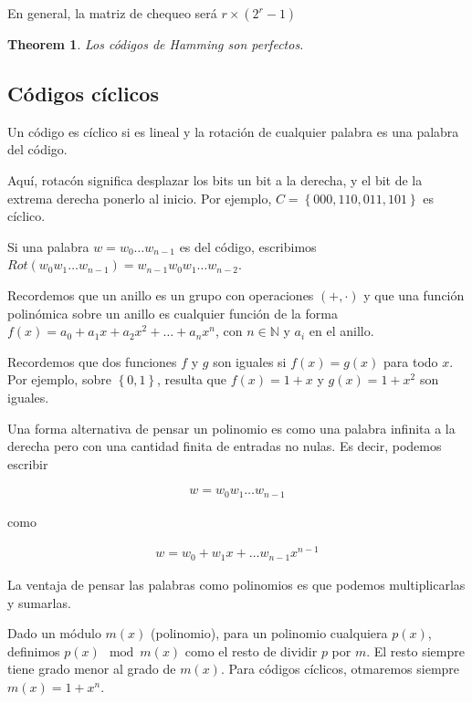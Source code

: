 \documentclass[a4paper]{article}
\newtheorem{theorem}{Theorem}
\newtheorem{theorem}{Theorem}
\begin{document}
En general, la matriz de chequeo será $r \times (2^r - 1)$

\begin{theorem}
    Los códigos de Hamming son perfectos.
\end{theorem}

\subsection{Códigos cíclicos}

\begin{definition}
    Un código es cíclico si es lineal y la rotación de cualquier palabra es una palabra 
    del código.
\end{definition}

Aquí, rotacón significa desplazar los bits un bit a la derecha, y el bit de la extrema 
derecha ponerlo al inicio. Por ejemplo, $C = \left\{ 000, 110, 011, 101 \right\} $ es 
cíclico.

Si una palabra $w = w_0 \ldots w_{n-1}$ es del código, escribimos $Rot(w_0 w_1
\ldots w_{n-1}) = w_{n-1}w_0 w_1 \ldots w_{n-2}$.

Recordemos que un anillo es un grupo con operaciones $(+, \cdot)$ y que una
función polinómica sobre un anillo es cualquier función de la forma $f(x) = a_0
+ a_1x + a_2x^2 + \ldots + a_nx^n$, con $n \in \mathbb{N}$ y $a_i$ en el
anillo.

Recordemos que dos funciones $f$ y $g$ son iguales si $f(x) = g(x)$ para todo $x$.
Por ejemplo, sobre $\left\{ 0, 1 \right\} $, resulta que $f(x) = 1 + x$ y $g(x) = 1 + x^2$
son iguales.

Una forma alternativa de pensar un polinomio es como una palabra infinita a la derecha 
pero con una cantidad finita de entradas no nulas. Es decir, podemos escribir 

\begin{align*}
    w = w_0 w_1 \ldots w_{n - 1}
\end{align*}

como 

\begin{align*}
    w = w_0 + w_1x + \ldots w_{n-1}x^{n-1}
\end{align*}

La ventaja de pensar las palabras como polinomios es que podemos multiplicarlas 
y sumarlas.

Dado un módulo $m(x)$ (polinomio), para un polinomio cualquiera $p(x)$,
definimos $p(x) \mod m(x)$ como el resto de dividir $p$ por $m$. El resto 
siempre tiene grado menor al grado de $m(x)$. Para códigos cíclicos,
otmaremos siempre $m(x) = 1 + x^n$.
\end{document}
